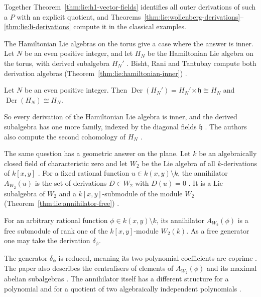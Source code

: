 Together Theorem~\ref{thm:lie:h1-vector-fields} identifies all outer
derivations of such a $P$ with an explicit quotient, and
Theorems~\ref{thm:lie:wollenberg-derivations}--\ref{thm:lie:li-derivations}
compute it in the classical examples.

The Hamiltonian Lie algebras on the torus give a case where the answer is
inner. Let $N$ be an even positive integer, and let $H_{N}$ be the
Hamiltonian Lie algebra on the torus, with derived subalgebra $H_{N}'$
\cite[p.~1]{BishtRaniTantubay2026}. Bisht, Rani and Tantubay compute both
derivation algebras (Theorem~\ref{thm:lie:hamiltonian-inner}) \cite[Theorems~17--18, p.~18]{BishtRaniTantubay2026}.

\begin{theorem}\label{thm:lie:hamiltonian-inner}
Let $N$ be an even positive integer. Then
$\operatorname{Der}(H_{N}')=H_{N}'\rtimes\mathfrak{h}\cong H_{N}$ and
$\operatorname{Der}(H_{N})\cong H_{N}$.
\end{theorem}

So every derivation of the Hamiltonian Lie algebra is inner, and the derived
subalgebra has one more family, indexed by the diagonal fields $\mathfrak{h}$
\cite[p.~18]{BishtRaniTantubay2026}. The authors also compute the second
cohomology of $H_{N}$ \cite[Corollary~24, p.~23]{BishtRaniTantubay2026}.

The same question has a geometric answer on the plane. Let $k$ be an
algebraically closed field of characteristic zero and let $W_2$ be the Lie
algebra of all $k$-derivations of $k[x,y]$ \cite[p.~1]{IenaPetravchukRegeta2009}.
For a fixed rational function $u\in k(x,y)\setminus k$, the annihilator
$A_{W_2}(u)$ is the set of derivations $D\in W_2$ with $D(u)=0$
\cite[p.~2]{IenaPetravchukRegeta2009}. It is a Lie subalgebra of $W_2$ and a
$k[x,y]$-submodule of the module $W_2$ (Theorem~\ref{thm:lie:annihilator-free}) \cite[p.~2]{IenaPetravchukRegeta2009}.

\begin{theorem}\label{thm:lie:annihilator-free}
For an arbitrary rational function $\phi\in k(x,y)\setminus k$, its annihilator
$A_{W_2}(\phi)$ is a free submodule of rank one of the $k[x,y]$-module $W_2(k)$.
As a free generator one may take the derivation $\delta_\phi$.
\end{theorem}

The generator $\delta_\phi$ is reduced, meaning its two polynomial coefficients
are coprime \cite[p.~2]{IenaPetravchukRegeta2009}. The paper also describes the
centralisers of elements of $A_{W_2}(\phi)$ and its maximal abelian
subalgebras \cite[p.~2]{IenaPetravchukRegeta2009}. The annihilator itself has a
different structure for a polynomial and for a quotient of two algebraically
independent polynomials \cite[p.~2]{IenaPetravchukRegeta2009}.

